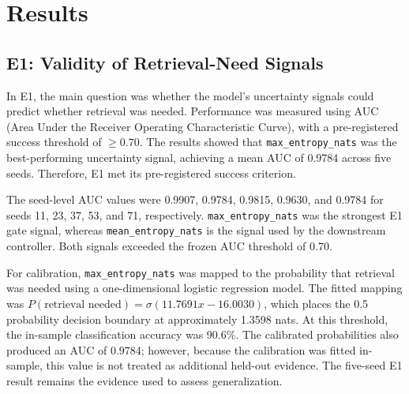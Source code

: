 \section{Results}
%

\subsection{E1: Validity of Retrieval-Need Signals}
\label{subsec:e1_signal_validity}
In E1, the main question was whether the model's uncertainty signals could predict whether retrieval was needed. Performance was measured using AUC (Area Under the Receiver Operating Characteristic Curve), with a pre-registered success threshold of \( \geq 0.70 \). The results showed that \texttt{max\_entropy\_nats} was the best-performing uncertainty signal, achieving a mean AUC of 0.9784 across five seeds. Therefore, E1 met its pre-registered success criterion.

The seed-level AUC values were 0.9907, 0.9784, 0.9815, 0.9630, and 0.9784 for seeds 11, 23, 37, 53, and 71, respectively. \texttt{max\_entropy\_nats} was the strongest E1 gate signal, whereas \texttt{mean\_entropy\_nats} is the signal used by the downstream controller. Both signals exceeded the frozen AUC threshold of 0.70.

For calibration, \texttt{max\_entropy\_nats} was mapped to the probability that retrieval was needed using a one-dimensional logistic regression model. The fitted mapping was \(P(\text{retrieval needed}) = \sigma(11.7691x - 16.0030)\), which places the 0.5 probability decision boundary at approximately 1.3598 nats. At this threshold, the in-sample classification accuracy was 90.6\%. The calibrated probabilities also produced an AUC of 0.9784; however, because the calibration was fitted in-sample, this value is not treated as additional held-out evidence. The five-seed E1 result remains the evidence used to assess generalization.


